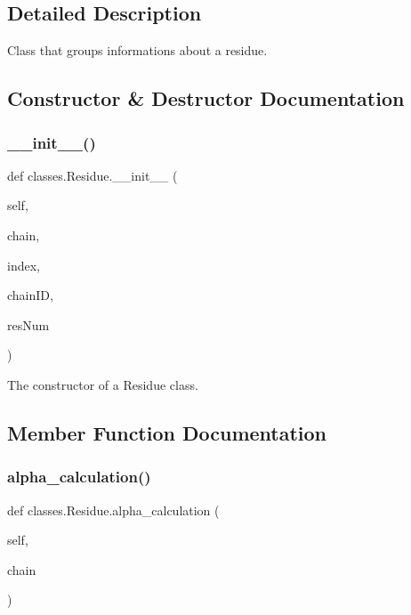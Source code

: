 \subsection{Detailed Description}
\begin{DoxyVerb}Class that groups informations about a residue.\end{DoxyVerb}
 

\subsection{Constructor \& Destructor Documentation}
\mbox{\label{classclasses_1_1Residue_af632a3e7f910bb899516c7496ff68f74}} 
\subsubsection{\texorpdfstring{\+\_\+\+\_\+init\+\_\+\+\_\+()}{\_\_init\_\_()}}
{\footnotesize\ttfamily def classes.\+Residue.\+\_\+\+\_\+init\+\_\+\+\_\+ (\begin{DoxyParamCaption}\item[{}]{self,  }\item[{}]{chain,  }\item[{}]{index,  }\item[{}]{chain\+ID,  }\item[{}]{res\+Num }\end{DoxyParamCaption})}

\begin{DoxyVerb}The constructor of a Residue class.\end{DoxyVerb}
 

\subsection{Member Function Documentation}
\mbox{\label{classclasses_1_1Residue_acd9bbebf711e2680e3adf4a3b0421645}} 
\subsubsection{\texorpdfstring{alpha\+\_\+calculation()}{alpha\_calculation()}}
{\footnotesize\ttfamily def classes.\+Residue.\+alpha\+\_\+calculation (\begin{DoxyParamCaption}\item[{}]{self,  }\item[{}]{chain }\end{DoxyParamCaption})}

